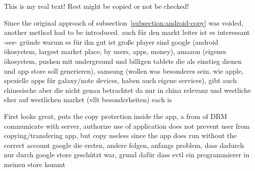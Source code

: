 This is my real text! Rest might be copied or not be checked!

Since the original approach of subsection~\ref{subsection:android-copy} was voided, another method had to be introduced.
auch für den markt leiter ist es interessant -see- gründe warum es für ihn gut ist
große player sind google (android ökosystem, largest market place, by users, apps, money), amazon (eigenes ökosystem, pushen mit underground und billigen tablets die als einstieg dienen und app store soll generieren), samsung (wollen was besonderes sein, wie apple, spezielle apps für galaxy/note devices, haben auch eigene services), gibt auch chinesische aber die nicht genau betrachtet da nur in china relevanz und westliche eher auf westlichen market (vllt besonderheiten)
each is





First looks great, puts the copy protection inside the app, a from of DRM\newline
communicate with server, authorize use of application\newline
does not prevent user from copying/transfering app, but copy useless since the app does run without the correct account\newline
google die ersten, andere folgen, anfangs problem, dass dadurch nur durch google store geschützt war, grund dafür dass evtl ein programmierer in meinen store kommt\newline
